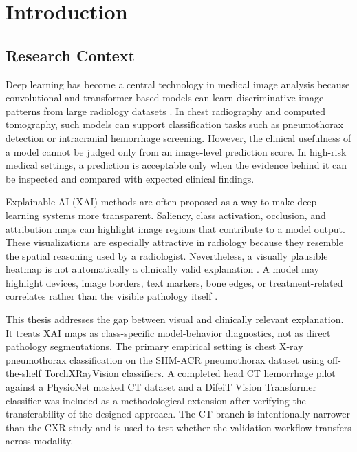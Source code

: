 \hypertarget{introduction}{%
	\chapter{Introduction}\label{introduction}}

\hypertarget{research-context}{%
	\section{Research Context}\label{research-context}}

Deep learning has become a central technology in medical image analysis
because convolutional and transformer-based models can learn
discriminative image patterns from large radiology datasets
\cite{ref-medical-xai-review}. In chest radiography and computed
tomography, such models can support classification tasks such as
pneumothorax detection or intracranial hemorrhage screening. However,
the clinical usefulness of a model cannot be judged only from an
image-level prediction score. In high-risk medical settings, a
prediction is acceptable only when the evidence behind it can
be inspected and compared with expected clinical findings.

Explainable AI (XAI) methods are often proposed as a way to make deep
learning systems more transparent. Saliency, class activation,
occlusion, and attribution maps can highlight image regions that
contribute to a model output. These visualizations are especially
attractive in radiology because they resemble the spatial reasoning used
by a radiologist. Nevertheless, a visually plausible heatmap is not
automatically a clinically valid explanation
\cite{ref-saliency-trust-medical}. A model may highlight devices, image
borders, text markers, bone edges, or treatment-related correlates
rather than the visible pathology itself \cite{ref-clever-hans}.

This thesis addresses the gap between visual and
clinically relevant explanation. It treats XAI maps as class-specific
model-behavior diagnostics, not as direct pathology segmentations. The
primary empirical setting is chest X-ray pneumothorax classification on
the SIIM-ACR pneumothorax dataset using off-the-shelf TorchXRayVision
classifiers. A completed head CT hemorrhage pilot against a PhysioNet masked
CT dataset and a DifeiT Vision Transformer classifier was included as a
methodological extension after verifying the transferability of the designed approach.
The CT branch is intentionally narrower than the CXR study and is used to test whether
the validation workflow transfers across modality.

